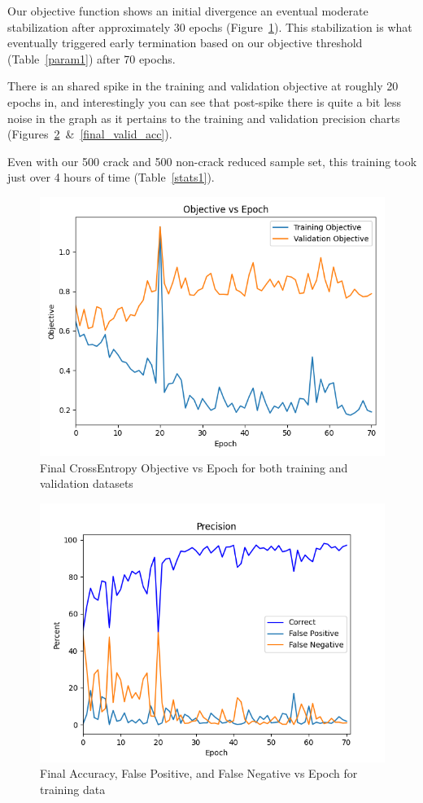 \documentclass[conference]{IEEEtran}
\begin{document}
Our objective function shows an initial divergence an eventual moderate stabilization after approximately 30 epochs (Figure~\ref{final_obj}). This stabilization is what eventually triggered early termination based on our objective threshold (Table~\ref{param1}) after 70 epochs.

There is an shared spike in the training and validation objective at roughly 20 epochs in, and interestingly you can see that post-spike there is quite a bit less noise in the graph as it pertains to the training and validation precision charts (Figures~\ref{final_train_acc}~\&~\ref{final_valid_acc}).

Even with our 500 crack and 500 non-crack reduced sample set, this training took just over 4 hours of time (Table~\ref{stats1}). 

\begin{figure}[htbp]
\centerline{\includegraphics[width=.5\textwidth]{images/exp3/test_model_all_objective.png}}
\caption{Final CrossEntropy Objective vs Epoch for both training and validation datasets}
\label{final_obj}
\end{figure}

\begin{figure}[htbp]
\centerline{\includegraphics[width=.5\textwidth]{images/exp3/test_model_training.png}}
\caption{Final Accuracy, False Positive, and False Negative vs Epoch for training data}
\label{final_train_acc}
\end{figure}
\end{document}
